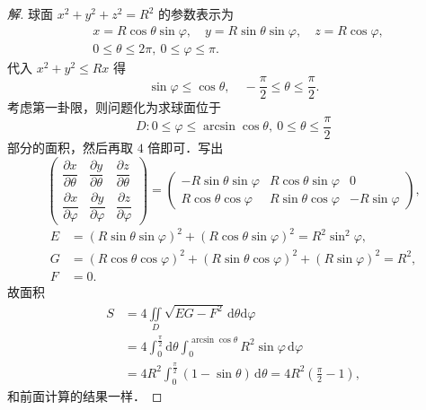\begin{proof}[解]
球面 $x^{2}+y^{2}+z^{2}=R^{2}$ 的参数表示为
\[
\begin{aligned}
&x=R\cos\theta\sin\varphi,\quad y=R\sin\theta\sin\varphi,\quad z=R\cos\varphi,\\
&0\leqslant\theta\leqslant 2\pi,\ 0\leqslant\varphi\leqslant\pi.
\end{aligned}
\]
代入 $x^{2}+y^{2}\leqslant Rx$ 得
\[
\sin\varphi\leqslant\cos\theta,\quad-\frac{\pi}{2}\leqslant\theta\leqslant\frac{\pi}{2}.
\]
考虑第一卦限，则问题化为求球面位于
\[
D\colon 0\leqslant\varphi\leqslant\arcsin\cos\theta,\ 0\leqslant\theta\leqslant\frac{\pi}{2}
\]
部分的面积，然后再取 $4$ 倍即可．写出
\[
\begin{pmatrix}
\dfrac{\partial x}{\partial\theta} & \dfrac{\partial y}{\partial\theta} & \dfrac{\partial z}{\partial\theta}\\[6pt]
\dfrac{\partial x}{\partial\varphi} & \dfrac{\partial y}{\partial\varphi} & \dfrac{\partial z}{\partial\varphi}
\end{pmatrix}=\begin{pmatrix}
-R\sin\theta\sin\varphi & R\cos\theta\sin\varphi & 0\\
R\cos\theta\cos\varphi & R\sin\theta\cos\varphi & -R\sin\varphi
\end{pmatrix},
\]
\[
\begin{aligned}
E&=\left(R\sin\theta\sin\varphi\right)^{2}+\left(R\cos\theta\sin\varphi\right)^{2}=R^{2}\sin^{2}\varphi,\\
G&=\left(R\cos\theta\cos\varphi\right)^{2}+\left(R\sin\theta\cos\varphi\right)^{2}+\left(R\sin\varphi\right)^{2}=R^{2},\\
F&=0.
\end{aligned}
\]
故面积
\[
\begin{aligned}
S&=4\iint\limits_{D}\sqrt{EG-F^{2}}\,\mathrm{d}\theta\mathrm{d}\varphi\\
&=4\int_{0}^{\frac{\pi}{2}}\mathrm{d}\theta\int_{0}^{\arcsin\cos\theta}R^{2}\sin\varphi\,\mathrm{d}\varphi\\
&=4R^{2}\int_{0}^{\frac{\pi}{2}}(1-\sin\theta)\,\mathrm{d}\theta=4R^{2}\left(\frac{\pi}{2}-1\right),
\end{aligned}
\]
和前面计算的结果一样．
\end{proof}


